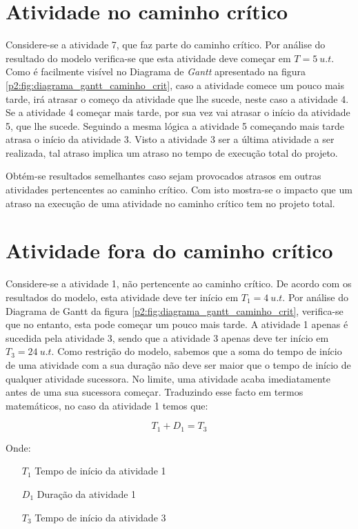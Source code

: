 \section{Atividade no caminho crítico}

Considere-se a atividade 7, que faz parte do caminho crítico. Por análise do
resultado do modelo verifica-se que esta atividade deve começar em $T = 5~u.t$. Como
é facilmente visível no Diagrama de \emph{Gantt} apresentado na figura \ref{p2:fig:diagrama_gantt_caminho_crit},
caso a atividade comece um pouco mais tarde, irá atrasar o começo da atividade
que lhe sucede, neste caso a atividade 4. Se a atividade 4 começar mais tarde,
por sua vez vai atrasar o início da atividade 5, que lhe sucede. Seguindo
a mesma lógica a atividade 5 começando mais tarde atrasa o início da atividade
3. Visto a atividade 3 ser a última atividade a ser realizada, tal atraso implica um atraso no tempo de execução total do projeto.

Obtém-se resultados semelhantes caso sejam provocados atrasos em outras atividades pertencentes ao caminho crítico. Com isto mostra-se o impacto que um atraso na execução de uma atividade no caminho crítico tem no projeto total.

\section{Atividade fora do caminho crítico}

Considere-se a atividade 1, não pertencente ao caminho crítico. De acordo com os
resultados do modelo, esta atividade deve ter início em $T_{1} = 4~u.t$. Por análise do Diagrama de Gantt da figura \ref{p2:fig:diagrama_gantt_caminho_crit}, verifica-se que no entanto, esta pode começar um pouco mais tarde. A atividade 1 apenas
é sucedida pela atividade 3, sendo que a atividade 3 apenas deve ter início em
$T_{3} = 24~u.t$. Como restrição do modelo, sabemos que a soma do tempo de início de
uma atividade com a sua duração não deve ser maior que o tempo de início de
qualquer atividade sucessora. No limite, uma atividade acaba imediatamente antes
de uma sua sucessora começar. Traduzindo esse facto em termos matemáticos, no
caso da atividade 1 temos que:

\begin{displaymath} T_{1} + D_{1} = T_{3} \end{displaymath}

Onde:

\begin{itemize} \item[$T_{1}$] Tempo de início da atividade 1 \item[$D_{1}$]
		Duração da atividade 1 \item[$T_{3}$] Tempo de início da atividade
			3 \end{itemize}

